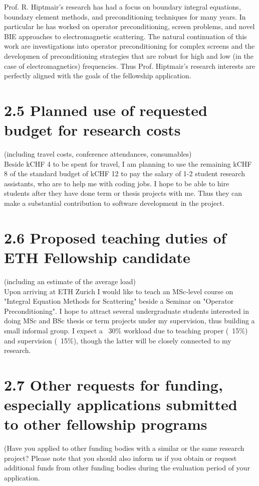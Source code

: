 \documentclass[]{article}
\begin{document}
Prof. R. Hiptmair's research has had a focus on boundary integral equations, boundary element methods, and preconditioning techniques for many years. In particular he has worked on operator preconditioning, screen problems, and novel BIE approaches to electromagnetic scattering. The natural continuation of this work are investigations into operator preconditioning for complex screens and the developmen of preconditioning strategies that are robust for high and low (in the case of electromagnetics) frequencies. Thus Prof. Hiptmair's research interests are perfectly aligned with the goals of the fellowship application.


\section*{2.5 Planned use of requested budget for research costs }
(including travel costs, conference attendances, consumables)\\

Beside kCHF 4 to be spent for travel, I am planning to use the remaining kCHF 8 of the standard budget of kCHF 12 to pay the salary of 1-2 student research assistants, who are to help me with coding jobs. I hope to be able to hire students after they have done term or thesis projects with me. Thus they can make a substantial contribution to software development in the project.

\section*{2.6 Proposed teaching duties of ETH Fellowship candidate}
(including an estimate of the average load)\\

Upon arriving at ETH Zurich I would like to teach an MSc-level course on "Integral
Equation Methods for Scattering" beside a Seminar on "Operator Preconditioning". I hope to attract several undergraduate students interested in doing MSc and BSc thesis or term projects under my supervision, thus building a small informal group. I expect a ~30\% workload due to teaching proper (~15\%) and supervision (~15\%), though the latter will be closely connected to my research.

\section*{2.7 Other requests for funding, especially applications submitted to other fellowship programs}
	(Have you applied to other funding bodies with a similar or the same research project? Please note that you should also inform us if you obtain or request additional funds from other funding bodies during the evaluation period of your application.\\
	
\end{document}
